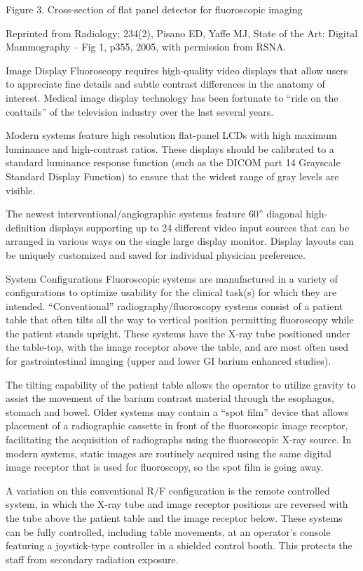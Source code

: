 \documentclass{assignment}
\begin{document}
\begin{problem}
{Figure 3. Cross-section of flat panel detector for fluoroscopic imaging


Reprinted from Radiology; 234(2), Pisano ED, Yaffe MJ, State of the Art: Digital Mammography – Fig 1, p355, 2005, with permission from RSNA.

Image Display
Fluoroscopy requires high-quality video displays that allow users to appreciate fine details and subtle contrast differences in the anatomy of interest. Medical image display technology has been fortunate to “ride on the coattails” of the television industry over the last several years.

Modern systems feature high resolution flat-panel LCDs with high maximum luminance and high-contrast ratios. These displays should be calibrated to a standard luminance response function (such as the DICOM part 14 Grayscale Standard Display Function) to ensure that the widest range of gray levels are visible.

The newest interventional/angiographic systems feature 60” diagonal high-definition displays supporting up to 24 different video input sources that can be arranged in various ways on the single large display monitor. Display layouts can be uniquely customized and saved for individual physician preference.

System Configurations
Fluoroscopic systems are manufactured in a variety of configurations to optimize usability for the clinical task(s) for which they are intended. “Conventional” radiography/fluoroscopy systems consist of a patient table that often tilts all the way to vertical position permitting fluoroscopy while the patient stands upright. These systems have the X-ray tube positioned under the table-top, with the image receptor above the table, and are most often used for gastrointestinal imaging (upper and lower GI barium enhanced studies).

The tilting capability of the patient table allows the operator to utilize gravity to assist the movement of the barium contrast material through the esophagus, stomach and bowel. Older systems may contain a “spot film” device that allows placement of a radiographic cassette in front of the fluoroscopic image receptor, facilitating the acquisition of radiographs using the fluoroscopic X-ray source. In modern systems, static images are routinely acquired using the same digital image receptor that is used for fluoroscopy, so the spot film is going away.

A variation on this conventional R/F configuration is the remote controlled system, in which the X-ray tube and image receptor positions are reversed with the tube above the patient table and the image receptor below. These systems can be fully controlled, including table movements, at an operator’s console featuring a joystick-type controller in a shielded control booth. This protects the staff from secondary radiation exposure.

}
\end{problem}
\end{document}
